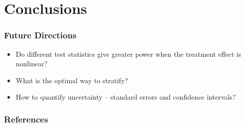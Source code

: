 \documentclass{beamer}
\begin{document}


\section[Conclusions]{Conclusions}
\frame
{
  \frametitle{Future Directions}
\begin{center}
\begin{itemize}
\itemsep20pt
\item Do different test statistics give greater power when the treatment effect is nonlinear?
\item What is the optimal way to stratify?
\item How to quantify uncertainty -- standard errors and confidence intervals?
\end{itemize}
\end{center}
}




\begin{frame}
\frametitle{References}
\tiny


\itemize
\end{frame}
\end{document}
